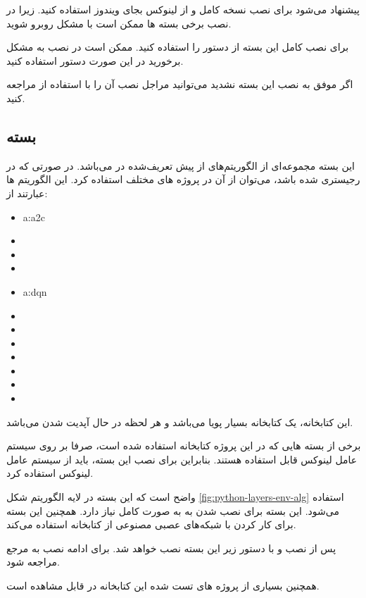 \begin{note}
	پیشنهاد می‌شود برای نصب نسخه کامل  و  از لینوکس بجای ویندوز استفاده کنید. زیرا در نصب برخی بسته ها ممکن است با مشکل روبرو شوید.
\end{note}

برای نصب کامل این بسته از دستور  را استفاده کنید. ممکن است در نصب  به مشکل برخورید در این صورت دستور  استفاده کنید.

اگر موفق به نصب این بسته نشدید می‌توانید مراجل نصب آن را با استفاده از 
\cite{medgyminstall}
مراجعه کنید.


\subsection{بسته }
این بسته مجموعه‌ای از الگوریتم‌های از پیش تعریف‌شده در  می‌باشد. در صورتی که  در  رجیستری شده باشد، می‌توان از آن در پروژه های مختلف استفاده کرد. این الگوریتم ها عبارتند از:

\begin{multicols}{3}
	\begin{itemize}
		\item \gls{a:a2c}
		\item {}
		\item {}
		\item {}
		\item \gls{a:dqn}
		\item {}
		\item {}
		\item {}
		\item {}
		\item {}
		\item {}
		\item {}
	\end{itemize}
\end{multicols}

این کتابخانه، یک کتابخانه بسیار پویا می‌باشد و هر لحظه در حال آپدیت شدن می‌باشد.

\begin{remark}
	برخی از بسته هایی که در این پروژه کتابخانه استفاده شده است، صرفا بر روی سیستم عامل لینوکس قابل استفاده هستند. بنابراین برای نصب این بسته، باید از سیستم عامل لینوکس استفاده کرد.
\end{remark}

واضح است که این بسته در لایه الگوریتم شکل \ref{fig:python-layers-env-alg} استفاده می‌شود. این بسته برای نصب شدن به  به صورت کامل نیاز دارد. همچنین این بسته برای کار کردن با شبکه‌های عصبی مصنوعی از کتابخانه  استفاده می‌کند.

پس از نصب  و  با دستور زیر این بسته نصب خواهد شد.
برای ادامه نصب به مرجع  \cite{stable-baselines-doc} مراجعه شود.

همچنین بسیاری از پروژه های تست شده این کتابخانه در \cite{stable-baselines-med} قابل مشاهده است.




